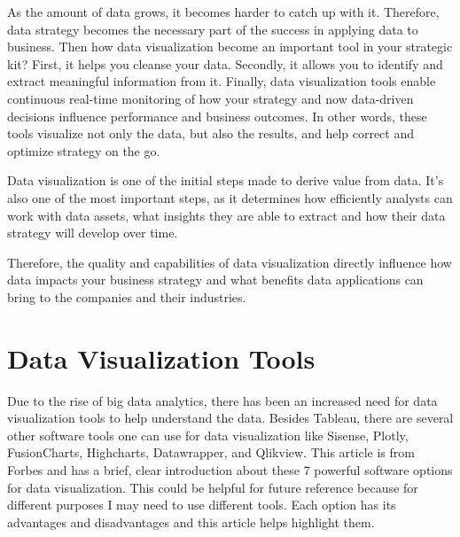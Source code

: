 \documentclass[]{book}
\theoremstyle{definition}
\theoremstyle{definition}
\theoremstyle{definition}
\theoremstyle{remark}
\begin{document}
As the amount of data grows, it becomes harder to catch up with it.
Therefore, data strategy becomes the necessary part of the success in
applying data to business. Then how data visualization become an
important tool in your strategic kit? First, it helps you cleanse your
data. Secondly, it allows you to identify and extract meaningful
information from it. Finally, data visualization tools enable continuous
real-time monitoring of how your strategy and now data-driven decisions
influence performance and business outcomes. In other words, these tools
visualize not only the data, but also the results, and help correct and
optimize strategy on the go.

Data visualization is one of the initial steps made to derive value from
data. It's also one of the most important steps, as it determines how
efficiently analysts can work with data assets, what insights they are
able to extract and how their data strategy will develop over time.

Therefore, the quality and capabilities of data visualization directly
influence how data impacts your business strategy and what benefits data
applications can bring to the companies and their industries.

\section{Data Visualization Tools}\label{data-visualization-tools}

Due to the rise of big data analytics, there has been an increased need
for data visualization tools to help understand the data. Besides
Tableau, there are several other software tools one can use for data
visualization like Sisense, Plotly, FusionCharts, Highcharts,
Datawrapper, and Qlikview. This article is from Forbes and has a brief,
clear introduction about these 7 powerful software options for data
visualization. This could be helpful for future reference because for
different purposes I may need to use different tools. Each option has
its advantages and disadvantages and this article helps highlight them.
\end{document}
